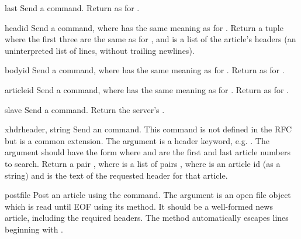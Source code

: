\begin{methoddesc}{last}{}
Send a  command.  Return as for .
\end{methoddesc}

\begin{methoddesc}{head}{id}
Send a  command, where  has the same meaning as for
.  Return a tuple
where the first three are the same as for ,
and  is a list of the article's headers (an uninterpreted
list of lines, without trailing newlines).
\end{methoddesc}

\begin{methoddesc}{body}{id}
Send a  command, where  has the same meaning as for
.  Return as for .
\end{methoddesc}

\begin{methoddesc}{article}{id}
Send a  command, where  has the same meaning as
for .  Return as for .
\end{methoddesc}

\begin{methoddesc}{slave}{}
Send a  command.  Return the server's .
\end{methoddesc}

\begin{methoddesc}{xhdr}{header, string}
Send an  command.  This command is not defined in the RFC
but is a common extension.  The  argument is a header
keyword, e.g. .  The  argument should have
the form  where  and
 are the first and last article numbers to search.  Return a
pair , where  is a list of
pairs , where  is an article id
(as a string) and  is the text of the requested header for
that article.
\end{methoddesc}

\begin{methoddesc}{post}{file}
Post an article using the  command.  The 
argument is an open file object which is read until EOF using its
 method.  It should be a well-formed news article,
including the required headers.  The  method
automatically escapes lines beginning with .
\end{methoddesc}

